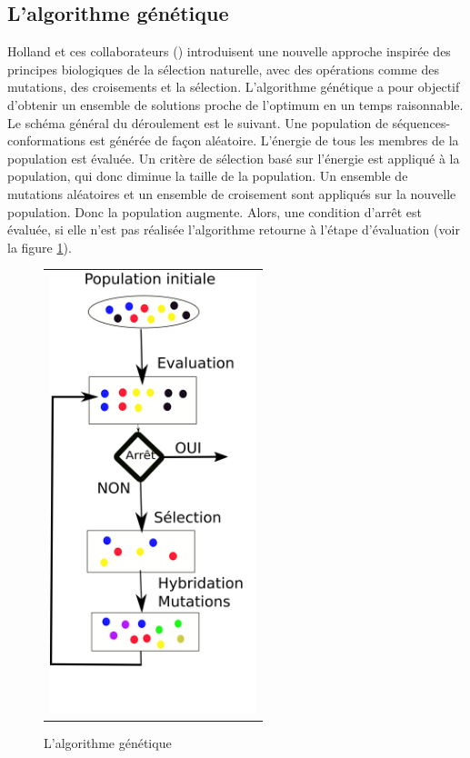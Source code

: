 \subsection{L'algorithme  génétique}


Holland et ces collaborateurs (\cite{Goldberg88}) introduisent une nouvelle approche inspirée des principes biologiques de la sélection naturelle, avec des opérations comme des mutations, des croisements et la sélection. L'algorithme génétique a pour objectif d'obtenir un ensemble de solutions proche de l'optimum en un temps raisonnable.
Le schéma général du déroulement est le suivant. Une population de séquences-conformations est générée de façon aléatoire. L'énergie de tous les membres de la population est évaluée. Un critère de sélection basé sur l'énergie est appliqué à la population, qui donc diminue la taille de la population. Un ensemble de mutations aléatoires et un ensemble de croisement sont appliqués sur la nouvelle population. Donc la population augmente. Alors, une condition d'arrêt est évaluée, si elle n'est pas réalisée l'algorithme retourne à l'étape d'évaluation (voir la figure \ref{fig:algo_gene}). 



\begin{figure}[!htbp]
  \centering
  \begin{tabular}{c}
    \includegraphics[width=6cm]{figure/algo_genetique.png} \\
  \end{tabular}
  \caption{L'algorithme génétique}
  \label{fig:algo_gene}
\end{figure}


